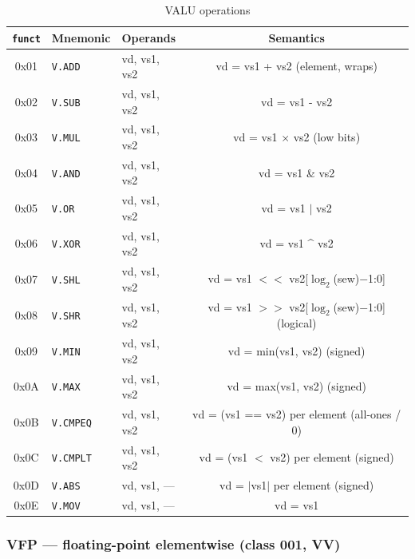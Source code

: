 \documentclass[11pt,a4paper]{article}
\begin{document}
\begin{table}[H]
\centering
\caption{VALU operations}
\begin{tabular}{cllc}
\toprule
{\tt funct} & Mnemonic & Operands & Semantics \\
\midrule
0x01 & {\tt V.ADD}  & vd, vs1, vs2 & vd = vs1 + vs2 (element, wraps) \\
0x02 & {\tt V.SUB}  & vd, vs1, vs2 & vd = vs1 - vs2 \\
0x03 & {\tt V.MUL}  & vd, vs1, vs2 & vd = vs1 $\times$ vs2 (low bits) \\
0x04 & {\tt V.AND}  & vd, vs1, vs2 & vd = vs1 \& vs2 \\
0x05 & {\tt V.OR}   & vd, vs1, vs2 & vd = vs1 $|$ vs2 \\
0x06 & {\tt V.XOR}  & vd, vs1, vs2 & vd = vs1 \^{} vs2 \\
0x07 & {\tt V.SHL}  & vd, vs1, vs2 & vd = vs1 $<<$ vs2[$\log_2$(sew)$-$1:0] \\
0x08 & {\tt V.SHR}  & vd, vs1, vs2 & vd = vs1 $>>$ vs2[$\log_2$(sew)$-$1:0] (logical) \\
0x09 & {\tt V.MIN}  & vd, vs1, vs2 & vd = min(vs1, vs2) (signed) \\
0x0A & {\tt V.MAX}  & vd, vs1, vs2 & vd = max(vs1, vs2) (signed) \\
0x0B & {\tt V.CMPEQ} & vd, vs1, vs2 & vd = (vs1 == vs2) per element (all-ones / 0) \\
0x0C & {\tt V.CMPLT} & vd, vs1, vs2 & vd = (vs1 $<$ vs2) per element (signed) \\
0x0D & {\tt V.ABS}  & vd, vs1, --- & vd = $|$vs1$|$ per element (signed) \\
0x0E & {\tt V.MOV}  & vd, vs1, --- & vd = vs1 \\
\bottomrule
\end{tabular}
\end{table}

\subsubsection*{VFP --- floating-point elementwise (class 001, VV)}
\end{document}
